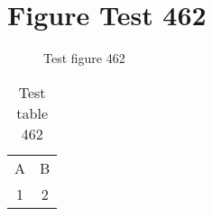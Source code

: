 \documentclass{article}
\begin{document}
\section{Figure Test 462}
\begin{figure}[h]
\caption{Test figure 462}
\end{figure}
\begin{table}[h]
\caption{Test table 462}
\begin{tabular}{cc}
A & B \\
1 & 2
\end{tabular}
\end{table}
\end{document}
